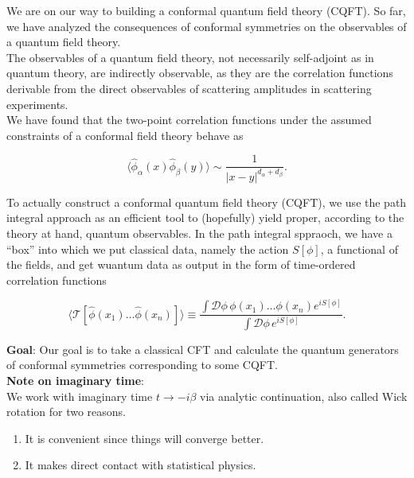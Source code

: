 
\noindent We are on our way to building a conformal quantum field theory (CQFT). So far, we have analyzed the consequences of conformal symmetries on the observables of a quantum field theory. \\

\noindent The observables of a quantum field theory, not necessarily self-adjoint as in quantum theory, are indirectly observable, as they are the correlation functions derivable from the direct observables of scattering amplitudes in scattering experiments. \\

\noindent We have found that the two-point correlation functions under the assumed constraints of a conformal field theory behave as

\begin{equation}
\langle \hat{\phi}_\alpha (x) \hat{\phi}_\beta (y) \rangle \sim \frac{1}{|x-y|^{d_\alpha + d_\beta}}.
\end{equation}

\noindent To actually construct a conformal quantum field theory (CQFT), we use the path integral approach as an efficient tool to (hopefully) yield proper, according to the theory at hand, quantum observables. In the path integral sppraoch, we have a ``box'' into which we put classical data, namely the action $S[\phi]$, a functional of the fields, and get wuantum data as output in the form of time-ordered correlation functions

\begin{equation}
\langle \mathcal{T} [ \hat{\phi} (x_1) \dots \hat{\phi} (x_n) ] \rangle \equiv \frac{\int \mathcal{D}\phi \, \phi (x_1) \dots \phi (x_n) e^{iS[\phi]}}{\int \mathcal{D} \phi \, e^{iS[\phi]}}.
\end{equation}

\noindent \textbf{Goal}: Our goal is to take a classical CFT and calculate the quantum generators of conformal symmetries corresponding to some CQFT. \\

\noindent \textbf{Note on imaginary time}: \\

\noindent We work with imaginary time $t \rightarrow -i \beta$ via analytic continuation, also called Wick rotation for two reasons.

\begin{enumerate}
\item It is convenient since things will converge better.
\item It makes direct contact with statistical physics.
\end{enumerate}

